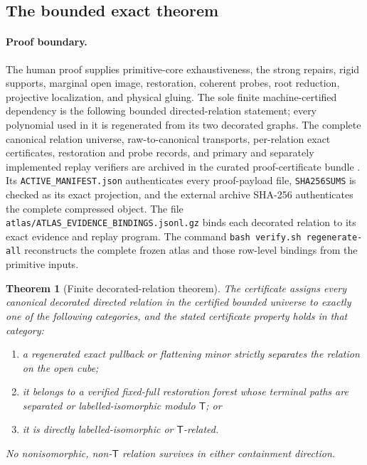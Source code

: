 \documentclass[11pt]{article}
\newtheorem{theorem}{Theorem}[section]
\theoremstyle{remark}
\newcommand{\Tmove}{\mathsf T}
\begin{document}
\subsection{The bounded exact theorem}

\paragraph{Proof boundary.}
The human proof supplies primitive-core exhaustiveness, the strong repairs,
rigid supports, marginal open image, restoration, coherent probes, root
reduction, projective localization, and physical gluing.  The sole finite
machine-certified dependency is the following bounded directed-relation
statement; every polynomial used in it is regenerated from its two decorated
graphs.  The complete canonical relation universe, raw-to-canonical
transports, per-relation exact certificates, restoration and probe records,
and primary and separately implemented replay verifiers are archived in the
curated proof-certificate bundle \cite{KriebelAtlas2026}.
Its \texttt{ACTIVE\_MANIFEST.json} authenticates every proof-payload file,
\texttt{SHA256SUMS} is checked as its exact projection, and the external
archive SHA-256 authenticates the complete compressed object.  The file
\texttt{atlas/ATLAS\_EVIDENCE\_BINDINGS.jsonl.gz} binds each decorated
relation to its exact evidence and replay program.  The command
\texttt{bash verify.sh regenerate-all} reconstructs the complete frozen atlas
and those row-level bindings from the primitive inputs.

\begin{theorem}[Finite decorated-relation theorem]\label{thm:atlas}
The certificate assigns every canonical decorated directed relation in the
certified bounded universe to exactly one of the following categories, and
the stated certificate property holds in that category:
\begin{enumerate}[label=\textup{\Alph*.}]
\item a regenerated exact pullback or flattening minor strictly separates
      the relation on the open cube;
\item it belongs to a verified fixed-full restoration forest whose terminal
      paths are separated or labelled-isomorphic modulo $\Tmove$; or
\item it is directly labelled-isomorphic or $\Tmove$-related.
\end{enumerate}
No nonisomorphic, non-$\Tmove$ relation survives in either containment
direction.
\end{theorem}
\end{document}
